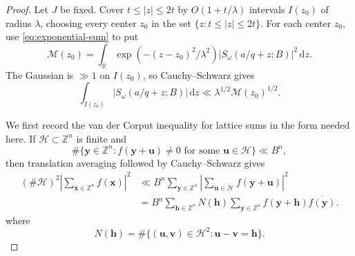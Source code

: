 \documentclass[10pt,a4paper]{amsart}
\newcommand{\RR}{\mathbb R}
\newcommand{\ZZ}{\mathbb Z}
\newcommand{\dint}{\,\mathrm d}
\newcommand{\h}{\mathbf h}
\newcommand{\x}{\mathbf{x}}
\begin{document}
\begin{proof}
Let \(J\) be fixed.
Cover \(t\leq|z|\leq2t\) by \(O(1+t/\lambda)\) intervals \(I(z_0)\) of radius \(\lambda\), choosing every center \(z_0\) in the set \(\{z:t\leq|z|\leq2t\}\).
For each center \(z_0\), use \eqref{eq:exponential-sum} to put
\[
 \mathcal M(z_0)=\int_{\RR}
 \exp(-(z-z_0)^2/\lambda^2)
 |S_\omega(a/q+z;B)|^2\dint z.
\]
The Gaussian is \(\gg 1\) on \(I(z_0)\), so Cauchy--Schwarz gives
\begin{equation}\label{eq:interval-cauchy}
 \int_{I(z_0)}|S_\omega(a/q+z;B)|\dint z
 \ll\lambda^{1/2}\mathcal M(z_0)^{1/2}.
\end{equation}

We first record the van der Corput inequality for lattice sums in the form needed here.
If \(\mathcal H\subset\ZZ^n\) is finite and
\[
 \#\{\mathbf y\in\ZZ^n:f(\mathbf y+\mathbf u)\neq0
 \text{ for some }\mathbf u\in\mathcal H\}\ll B^n,
\]
then translation averaging followed by Cauchy--Schwarz gives
\begin{equation}\label{eq:general-vdc}
 \begin{aligned}
 (\#\mathcal H)^2\left|\sum_{\x\in\ZZ^n}f(\x)\right|^2
 &\ll B^n\sum_{\mathbf y\in\ZZ^n}
 \left|\sum_{\mathbf u\in\mathcal H}f(\mathbf y+\mathbf u)\right|^2\\
 &=B^n\sum_{\h\in\ZZ^n}N(\h)
 \sum_{\mathbf y\in\ZZ^n}
 f(\mathbf y+\h)\overline{f(\mathbf y)}.
 \end{aligned}
\end{equation}
where
\[
 N(\h)=\#\{(\mathbf u,\mathbf v)\in\mathcal H^2: \mathbf u-\mathbf v=\h\}.
\]


\end{proof}
\end{document}
